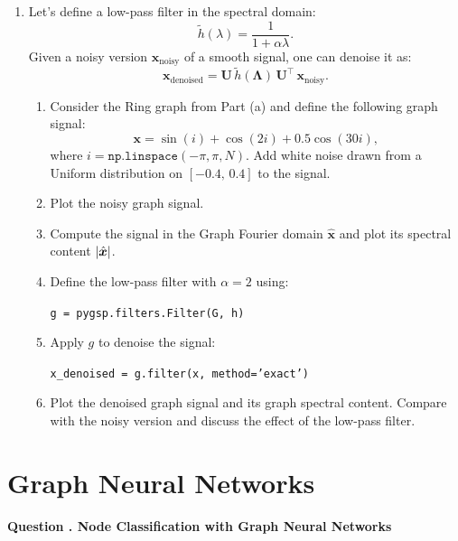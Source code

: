 \documentclass{article}
\newcounter{questioncounter}
\newcommand{\question}[1]{%
  \stepcounter{questioncounter}%
  \vspace{1em}%
  \noindent\textbf{\textcolor{deepblue}{\large Question \thequestioncounter.} #1}%
  \vspace{0.3em}%
}
\DeclarePairedDelimiter\abs{\lvert}{\rvert}
\begin{document}
\begin{enumerate}[leftmargin=1.5em]
    \item Let's define a low-pass filter in the spectral domain:
    \[
        \tilde{h}(\lambda) = \frac{1}{1 + \alpha\lambda}.
    \]
    Given a noisy version $\bm{x}_{\mathrm{noisy}}$ of a smooth signal, one can denoise it as:
    \[
        \bm{x}_{\mathrm{denoised}} = \mathbf{U}\,\tilde{h}(\mathbf{\Lambda})\,\mathbf{U}^\top\, \bm{x}_{\mathrm{noisy}}.
    \]
    \begin{enumerate}[leftmargin=1.5em]
        \item Consider the Ring graph from Part (a) and define the following graph signal:
        \[
            \bm{x} = \sin(i) + \cos(2i) + 0.5\cos(30i),
        \]
        where $i = \texttt{np.linspace}(-\pi, \pi, N)$. Add white noise drawn from a Uniform distribution on $[-0.4,\, 0.4]$ to the signal.
        \item Plot the noisy graph signal.
        \item Compute the signal in the Graph Fourier domain $\hat{\bm{x}}$ and plot its spectral content $\abs{\hat{\bm{x}}}$.
        \item Define the low-pass filter with $\alpha = 2$ using:
        \begin{center}
            \texttt{g = pygsp.filters.Filter(G, h)}
        \end{center}
        \item Apply $g$ to denoise the signal:
        \begin{center}
            \texttt{x\_denoised = g.filter(x, method='exact')}
        \end{center}
        \item Plot the denoised graph signal and its graph spectral content. Compare with the noisy version and discuss the effect of the low-pass filter.
    \end{enumerate}
\end{enumerate}

\newpage

\section{Graph Neural Networks}

\setcounter{questioncounter}{2}

\question{\textbf{Node Classification with Graph Neural Networks}}
\end{document}
